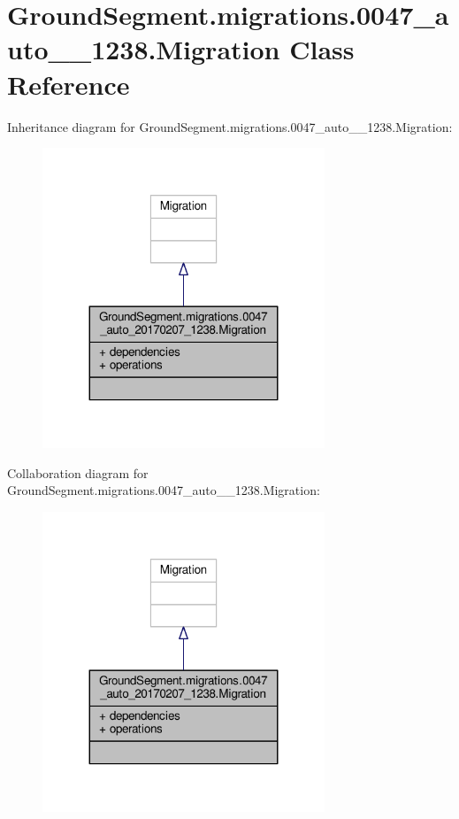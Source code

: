 \hypertarget{class_ground_segment_1_1migrations_1_10047__auto__20170207__1238_1_1_migration}{}\section{Ground\+Segment.\+migrations.0047\+\_\+auto\+\_\+\_\+1238.Migration Class Reference}
\label{class_ground_segment_1_1migrations_1_10047__auto__20170207__1238_1_1_migration}


Inheritance diagram for Ground\+Segment.\+migrations.0047\+\_\+auto\+\_\+\_\+1238.Migration\+:\nopagebreak
\begin{figure}[H]
\begin{center}
\leavevmode
\includegraphics[width=239pt]{class_ground_segment_1_1migrations_1_10047__auto__20170207__1238_1_1_migration__inherit__graph}
\end{center}
\end{figure}


Collaboration diagram for Ground\+Segment.\+migrations.0047\+\_\+auto\+\_\+\_\+1238.Migration\+:\nopagebreak
\begin{figure}[H]
\begin{center}
\leavevmode
\includegraphics[width=239pt]{class_ground_segment_1_1migrations_1_10047__auto__20170207__1238_1_1_migration__coll__graph}
\end{center}
\end{figure}
